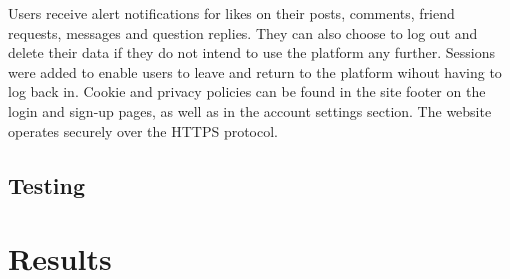 \documentclass[lettersize,journal]{IEEEtran}
\begin{document}
 Users receive alert notifications for likes on their posts, comments, friend requests, messages and question replies. They can also choose to log out and delete their data if they do not intend
 to use the platform any further. Sessions were added to enable users to leave and return to the platform wihout having to log back in. Cookie and privacy policies can be found in the site
 footer on the login and sign-up pages, as well as in the account settings section. The website operates securely over the HTTPS protocol.

 \subsection{Testing}

\section{Results}
\end{document}

